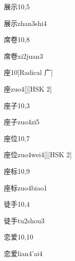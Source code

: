 \begin{entry}{展示}{10,5}
  \begin{phonetics}{展示}{zhan3shi4}
  \end{phonetics}
\end{entry}

\begin{entry}{席卷}{10,8}
  \begin{phonetics}{席卷}{xi2juan3}
  \end{phonetics}
\end{entry}

\begin{entry}{座}{10}[Radical 广]
  \begin{phonetics}{座}{zuo4}[][HSK 2]
  \end{phonetics}
\end{entry}

\begin{entry}{座子}{10,3}
  \begin{phonetics}{座子}{zuo4zi5}
  \end{phonetics}
\end{entry}

\begin{entry}{座位}{10,7}
  \begin{phonetics}{座位}{zuo4wei4}[][HSK 2]
  \end{phonetics}
\end{entry}

\begin{entry}{座标}{10,9}
  \begin{phonetics}{座标}{zuo4biao1}
  \end{phonetics}
\end{entry}

\begin{entry}{徒手}{10,4}
  \begin{phonetics}{徒手}{tu2shou3}
  \end{phonetics}
\end{entry}

\begin{entry}{恋爱}{10,10}
  \begin{phonetics}{恋爱}{lian4'ai4}
  \end{phonetics}
\end{entry}

